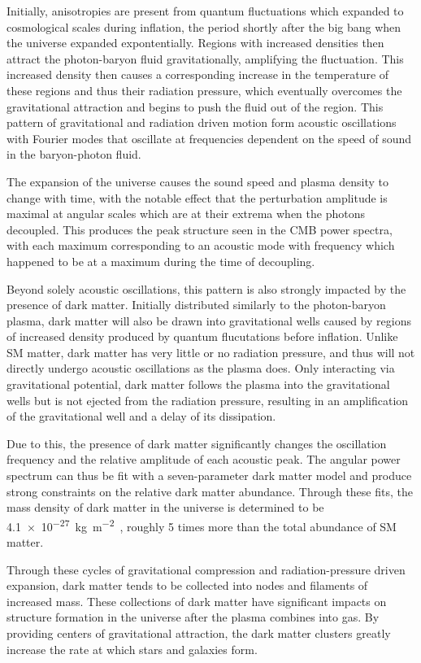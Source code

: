 Initially, anisotropies are present from quantum fluctuations which expanded to cosmological scales during inflation, the period shortly after the big bang when the universe expanded expontentially.
Regions with increased densities then attract the photon-baryon fluid gravitationally, amplifying the fluctuation.
This increased density then causes a corresponding increase in the temperature of these regions and thus their radiation pressure, which eventually overcomes the gravitational attraction and begins to push the fluid out of the region. 
This pattern of gravitational and radiation driven motion form acoustic oscillations with Fourier modes that oscillate at frequencies dependent on the speed of sound in the baryon-photon fluid.

The expansion of the universe causes the sound speed and plasma density to change with time, with the notable effect that the perturbation amplitude is maximal at angular scales which are at their extrema when the photons decoupled. 
This produces the peak structure seen in the CMB power spectra, with each maximum corresponding to an acoustic mode with frequency which happened to be at a maximum during the time of decoupling.

Beyond solely acoustic oscillations, this pattern is also strongly impacted by the presence of dark matter.
Initially distributed similarly to the photon-baryon plasma, dark matter will also be drawn into gravitational wells caused by regions of increased density produced by quantum flucutations before inflation.
Unlike SM matter, dark matter has very little or no radiation pressure, and thus will not directly undergo acoustic oscillations as the plasma does. 
Only interacting via gravitational potential, dark matter follows the plasma into the gravitational wells but is not ejected from the radiation pressure, resulting in an amplification of the gravitational well and a delay of its dissipation. 

Due to this, the presence of dark matter significantly changes the oscillation frequency and the relative amplitude of each acoustic peak.
The angular power spectrum can thus be fit with a seven-parameter dark matter model and produce strong constraints on the relative dark matter abundance.
Through these fits, the mass density of dark matter in the universe is determined to be \SI{4.1e-27}{\kilo\gram\per\meter\squared}~\cite{PlanckCMB}, roughly 5 times more than the total abundance of SM matter.

Through these cycles of gravitational compression and radiation-pressure driven expansion, dark matter tends to be collected into nodes and filaments of increased mass. 
These collections of dark matter have significant impacts on structure formation in the universe after the plasma combines into gas.
By providing centers of gravitational attraction, the dark matter clusters greatly increase the rate at which stars and galaxies form.

